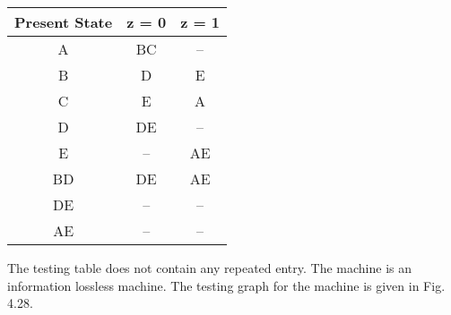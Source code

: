 \documentclass[a4,9pt]{beamer}
\begin{document}
\begin{frame}

\begin{center}
  \begin{tabular}{ccc}
\hline

\hline

\hline

\hline
Present State & z = 0 & z = 1\\
\hline
 A &     BC    &     --      \\
 B &     D     &     E      \\
 C &     E     &     A      \\
 D &     DE    &     --      \\
 E &     --    &     AE      \\
\hline
BD &   DE      &     AE      \\
DE &   --      &     --      \\
AE &   --      &     --      \\
\hline

\hline

\hline

\hline

  \end{tabular}
\end{center}

\pause
The testing table does not contain any repeated entry. The machine is an information lossless machine.
The testing graph for the machine is given in Fig. 4.28.

\end{frame}
\end{document}
